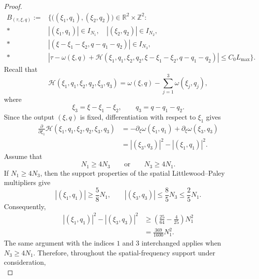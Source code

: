 \documentclass[12pt,oneside,reqno]{amsart}
\numberwithin{equation}{section}
\theoremstyle{plain}
\def\R{{\mathbb R}}
\def\Z{{\mathbb Z}}
\newcommand{\abs}[1]{%
    \left|#1\right|%
}
\def\pt{\partial}
\begin{document}
\begin{proof}
\begin{align}
\label{Beta}
B_{(\tau,\xi,q)}
:=&
\Big\{
\big((\xi_1,q_1),(\xi_2,q_2)\big)
\in\R^2\times\Z^2:
\nonumber\\*
&
\abs{(\xi_1,q_1)}\in I_{N_1},
\quad
\abs{(\xi_2,q_2)}\in I_{N_2},
\nonumber\\*
&
\abs{
    (\xi-\xi_1-\xi_2,q-q_1-q_2)
}
\in I_{N_3},
\nonumber\\*
&
\abs{
    \tau-\omega(\xi,q)
    +
    \mathcal H(
        \xi_1,q_1,
        \xi_2,q_2,
        \xi-\xi_1-\xi_2,
        q-q_1-q_2
    )
}
\leq
C_0L_{\max}
\Big\}.
\end{align}
Recall that
\begin{equation}
    \mathcal H(
        \xi_1,q_1,
        \xi_2,q_2,
        \xi_3,q_3
    )
    =
    \omega(\xi,q)
    -
    \sum_{j=1}^3
    \omega(\xi_j,q_j),
\end{equation}
where
\begin{equation}
    \xi_3
    =
    \xi-\xi_1-\xi_2,
    \qquad
    q_3
    =
    q-q_1-q_2.
\end{equation}
Since the output $(\xi,q)$ is fixed, differentiation with respect to
$\xi_1$ gives
\begin{align}
\frac{\pt}{\pt\xi_1}
\mathcal H(
    \xi_1,q_1,
    \xi_2,q_2,
    \xi_3,q_3
)
&=
-\pt_\xi\omega(\xi_1,q_1)
+
\pt_\xi\omega(\xi_3,q_3)
\nonumber\\
&=
\abs{(\xi_3,q_3)}^2
-
\abs{(\xi_1,q_1)}^2.
\label{eq:resonance-xi1-derivative}
\end{align}
Assume that
\begin{equation}
    N_1\geq4N_3
    \qquad\text{or}\qquad
    N_3\geq4N_1.
\end{equation}
If $N_1\geq4N_3$, then the support properties of the spatial
Littlewood--Paley multipliers give
\begin{equation*}
    \abs{(\xi_1,q_1)}\geq\frac58N_1,
    \qquad
    \abs{(\xi_3,q_3)}\leq\frac85N_3\leq\frac25N_1.
\end{equation*}
Consequently,
\begin{align}
\abs{(\xi_1,q_1)}^2-\abs{(\xi_3,q_3)}^2
&\geq
\left(\frac{25}{64}-\frac4{25}\right)N_1^2
\nonumber\\
&=
\frac{369}{1600}N_1^2.
\label{eq:frequency-separation-N1-N3}
\end{align}
The same argument with the indices $1$ and $3$ interchanged applies when
$N_3\geq4N_1$. Therefore, throughout the spatial-frequency support under
consideration,
\begin{equation}

\end{equation}
\end{proof}
\end{document}
